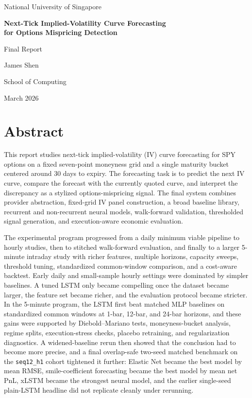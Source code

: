 \documentclass[12pt]{report}
\begin{document}
\begin{titlepage}
\centering
{\Large National University of Singapore\par}
\vspace{1.5cm}
{\Huge\bfseries Next-Tick Implied-Volatility Curve Forecasting\\[0.3em]for Options Mispricing Detection\par}
\vspace{1cm}
{\Large Final Report\par}
\vspace{2cm}
{\large James Shen\par}
{\large School of Computing\par}
\vfill
{\large March 2026\par}
\end{titlepage}

\chapter*{Abstract}
This report studies next-tick implied-volatility (IV) curve forecasting for SPY options on a fixed seven-point moneyness grid and a single maturity bucket centered around 30 days to expiry. The forecasting task is to predict the next IV curve, compare the forecast with the currently quoted curve, and interpret the discrepancy as a stylized options-mispricing signal. The final system combines provider abstraction, fixed-grid IV panel construction, a broad baseline library, recurrent and non-recurrent neural models, walk-forward validation, thresholded signal generation, and execution-aware economic evaluation.

The experimental program progressed from a daily minimum viable pipeline to hourly studies, then to stitched walk-forward evaluation, and finally to a larger 5-minute intraday study with richer features, multiple horizons, capacity sweeps, threshold tuning, standardized common-window comparison, and a cost-aware backtest. Early daily and small-sample hourly settings were dominated by simpler baselines. A tuned LSTM only became compelling once the dataset became larger, the feature set became richer, and the evaluation protocol became stricter. In the 5-minute program, the LSTM first beat matched MLP baselines on standardized common windows at 1-bar, 12-bar, and 24-bar horizons, and these gains were supported by Diebold--Mariano tests, moneyness-bucket analysis, regime splits, execution-stress checks, placebo retraining, and regularization diagnostics. A widened-baseline rerun then showed that the conclusion had to become more precise, and a final overlap-safe two-seed matched benchmark on the \texttt{seq12\_h1} cohort tightened it further: Elastic Net became the best model by mean RMSE, smile-coefficient forecasting became the best model by mean net PnL, xLSTM became the strongest neural model, and the earlier single-seed plain-LSTM headline did not replicate cleanly under rerunning.
\end{document}

